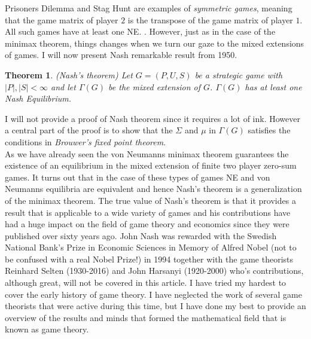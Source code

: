 \documentclass{article}
\newtheorem{theorem}{Theorem}[section]
\theoremstyle{definition}
\theoremstyle{remark}
\begin{document}
Prisoners Dilemma and Stag Hunt are examples of \emph{symmetric
  games}, meaning that the game matrix of player $2$ is the transpose of
the game matrix of player $1$. All such games have at least one
NE. \citep{cheng2004notes}. However, just as in the case of the
minimax theorem, things changes when we turn our gaze to the mixed
extensions of games. I will now present Nash remarkable result from 1950.

\begin{theorem}(Nash's theorem)
  Let $G = (P,U,S)$ be a strategic game with $|P|,|S| < \infty$ and
  let $\Gamma(G)$ be the mixed extension of $G$. $\Gamma(G)$ has at
  least one Nash Equilibrium. \citep{Maschler}
  \end{theorem}

  I will not provide a proof of Nash theorem since it requires a lot
  of ink. However a central part of the proof is to show that the
  $\Sigma$ and $\mu$ in $\Gamma(G)$ satisfies the conditions in
  \emph{Brouwer's fixed point theorem}.\\

  As we have already seen the von Neumanns minimax theorem guarantees
  the existence of an equilibrium in the mixed extension of finite two
  player zero-sum games. It turns out that in the case of these types
  of games NE and von Neumanns equilibria are equivalent and hence
  Nash's theorem is a generalization of the minimax theorem. The true
  value of Nash's theorem is that it provides a result that is
  applicable to a wide variety of games and his contributions have had
  a huge impact on the field of game theory and economics since they
  were published over sixty years ago. John Nash was rewarded with the
  Swedish National Bank's Prize in Economic Sciences in Memory of
  Alfred Nobel (not to be confused with a real Nobel Prize!) in 1994
  together with the game theorists Reinhard Selten (1930-2016) and
  John Harsanyi (1920-2000) who's contributions, although great, will
  not be covered in this article. I have tried my hardest to cover the
  early history of game theory. I have neglected the work of several
  game theorists that were active during this time, but I have done my
  best to provide an overview of the results and minds that formed the
  mathematical field that is known as game theory. 

\newpage

\printbibliography
\end{document}
